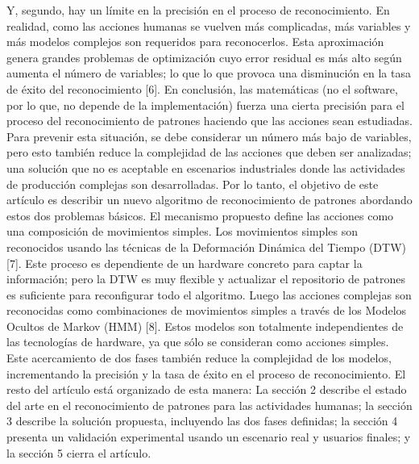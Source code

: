\documentclass[a4paper]{article}
\begin{document}
\begin{}
\begin{}
Y, segundo, hay un límite en la precisión en el proceso de reconocimiento. En realidad, como las acciones humanas se vuelven más complicadas, más variables y más modelos complejos son requeridos para reconocerlos. Esta aproximación genera grandes problemas de optimización cuyo error residual es más alto según aumenta el número de variables; lo que lo que provoca una disminución en la tasa de éxito del reconocimiento [6]. En conclusión, las matemáticas (no el software, por lo que, no depende de la implementación) fuerza una cierta precisión para el proceso del reconocimiento de patrones haciendo que las acciones sean estudiadas. Para prevenir esta situación, se debe considerar un número más bajo de variables, pero esto también reduce la complejidad de las acciones que deben ser analizadas; una solución que no es aceptable en escenarios industriales donde las actividades de producción complejas son desarrolladas.
Por lo tanto, el objetivo de este artículo es describir un nuevo algoritmo de reconocimiento de patrones abordando estos dos problemas básicos. El mecanismo propuesto define las acciones como una composición de movimientos simples. Los movimientos simples son reconocidos usando las técnicas de la Deformación Dinámica del Tiempo (DTW) [7]. Este proceso es dependiente de un hardware concreto para captar la información; pero la DTW es muy flexible y actualizar el repositorio de patrones es suficiente para reconfigurar todo el algoritmo. Luego las acciones complejas son reconocidas como combinaciones de movimientos simples a través de los Modelos Ocultos de Markov (HMM) [8]. Estos modelos son totalmente independientes de las tecnologías de hardware, ya que sólo se consideran como acciones simples. Este acercamiento de dos fases también reduce la complejidad de los modelos, incrementando la precisión y la tasa de éxito en el proceso de reconocimiento.
El resto del artículo está organizado de esta manera: La sección 2 describe el estado del arte en el reconocimiento de patrones para las actividades humanas; la sección 3 describe la solución propuesta, incluyendo las dos fases definidas; la sección 4 presenta un validación experimental usando un escenario real y usuarios finales; y la sección 5 cierra el artículo. 


\end{}
\end{}
\end{document}
